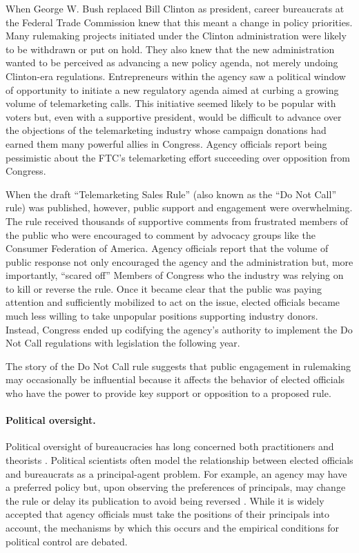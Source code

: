 When George W. Bush replaced Bill Clinton as president, career bureaucrats at the Federal Trade Commission knew that this meant a change in policy priorities. Many rulemaking projects initiated under the Clinton administration were likely to be withdrawn or put on hold. They also knew that the new administration wanted to be perceived as advancing a new policy agenda, not merely undoing Clinton-era regulations. Entrepreneurs within the agency saw a political window of opportunity to initiate a new regulatory agenda aimed at curbing a growing volume of telemarketing calls. This initiative seemed likely to be popular with voters but, even with a supportive president, would be difficult to advance over the objections of the telemarketing industry whose campaign donations had earned them many powerful allies in Congress. Agency officials report being pessimistic about the FTC's telemarketing effort succeeding over opposition from Congress.

When the draft ``Telemarketing Sales Rule'' (also known as the ``Do Not Call'' rule) was published, however, public support and engagement were overwhelming. The rule received thousands of supportive comments from frustrated members of the public who were encouraged to comment by advocacy groups like the Consumer Federation of America. Agency officials report that the volume of public response not only encouraged the agency and the administration but, more importantly, ``scared off'' Members of Congress who the industry was relying on to kill or reverse the rule. Once it became clear that the public was paying attention and sufficiently mobilized to act on the issue, elected officials became much less willing to take unpopular positions supporting industry donors. Instead, Congress ended up codifying the agency's authority to implement the Do Not Call regulations with legislation the following year.

The story of the Do Not Call rule suggests that public engagement in rulemaking may occasionally be influential because it affects the behavior of elected officials who have the power to provide key support or opposition to a proposed rule.


\paragraph{Political oversight.}
Political oversight of bureaucracies has long concerned both practitioners and theorists \citep{Wilson1989, Epstein1999, Huber2002, McCubbins1984, Wilson1989, Potter2016, Lowande2018}. Political scientists often model the relationship between elected officials and bureaucrats as a principal-agent problem. For example, an agency may have a preferred policy but, upon observing the preferences of principals, may change the rule or delay its publication to avoid being reversed \citep{Potter2016}. While it is widely accepted that agency officials must take the positions of their principals into account, the mechanisms by which this occurs and the empirical conditions for political control are debated.

